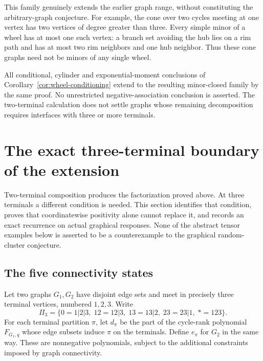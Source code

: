 \documentclass[11pt,a4paper]{article}
\theoremstyle{definition}
\theoremstyle{remark}\newtheorem{remark}[theorem]{Remark}
\begin{document}
This family genuinely extends the earlier graph range, without
constituting the arbitrary-graph conjecture. For example, the cone
over two cycles meeting at one vertex has two vertices of degree
greater than three. Every simple minor of a wheel has at most one
such vertex: a branch set avoiding the hub lies on a rim path and
has at most two rim neighbors and one hub neighbor. Thus these
cone graphs need not be minors of any single wheel.

All conditional, cylinder and exponential-moment conclusions of
Corollary~\ref{cor:wheel-conditioning} extend to the resulting
minor-closed family by the same proof. No unrestricted
negative-association conclusion is asserted. The two-terminal
calculation does not settle graphs whose remaining decomposition
requires interfaces with three or more terminals.



\section{The exact three-terminal boundary of the extension}
\label{sec:three-terminal}

Two-terminal composition produces the factorization proved above.
At three terminals a different condition is needed. This section
identifies that condition, proves that coordinatewise positivity alone
cannot replace it, and records an exact recurrence on actual graphical
responses. None of the abstract tensor examples below is asserted to
be a counterexample to the graphical random-cluster conjecture.

\subsection{The five connectivity states}

Let two graphs $G_1,G_2$ have disjoint edge sets and meet in precisely
three terminal vertices, numbered $1,2,3$. Write
\[
 \Pi_3=\{0=1|2|3,\;12=12|3,\;13=13|2,\;23=23|1,\;*=123\}.
\]
For each terminal partition $\pi$, let $d_\pi$ be the part of the
cycle-rank polynomial $F_{G_1,q}$ whose edge subsets induce $\pi$
on the terminals. Define $e_\pi$ for $G_2$ in the same way.
These are nonnegative polynomials, subject to the additional
constraints imposed by graph connectivity.
\end{document}
